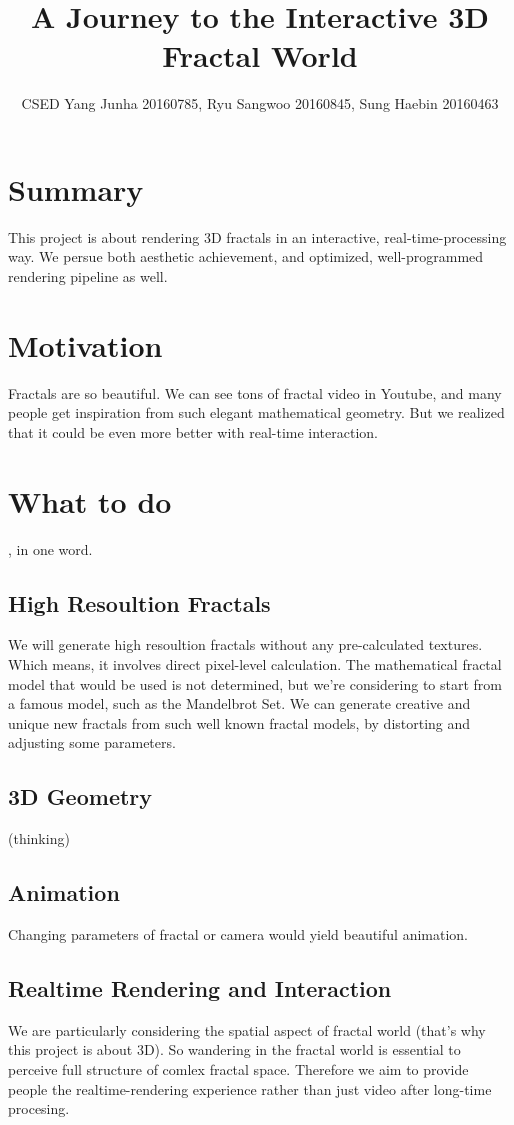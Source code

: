 \documentclass[a4paper]{article}
\title{A Journey to the Interactive 3D Fractal World}
\author{CSED Yang Junha 20160785, Ryu Sangwoo 20160845, Sung Haebin 20160463}
\begin{document}
\maketitle
\section{Summary}
This project is about rendering 3D fractals in an interactive, real-time-processing way.
We persue both aesthetic achievement, and optimized, well-programmed rendering pipeline as well.
\section{Motivation}
Fractals are so beautiful.
We can see tons of fractal video in Youtube, and many people get inspiration from such elegant mathematical geometry.
But we realized that it could be even more better with real-time interaction.
\section{What to do}
, in one word.
\subsection{High Resoultion Fractals}
We will generate high resoultion fractals without any pre-calculated textures.
Which means, it involves direct pixel-level calculation.
The mathematical fractal model that would be used is not determined, but we're considering to start from a famous model, such as the Mandelbrot Set.
We can generate creative and unique new fractals from such well known fractal models, by distorting and adjusting some parameters.
\subsection{3D Geometry}
(thinking)
\subsection{Animation}
Changing parameters of fractal or camera would yield beautiful animation.
\subsection{Realtime Rendering and Interaction}
We are particularly considering the spatial aspect of fractal world (that's why this project is about 3D).
So wandering in the fractal world is essential to perceive full structure of comlex fractal space.
Therefore we aim to provide people the realtime-rendering experience rather than just video after long-time procesing.
\end{document}
